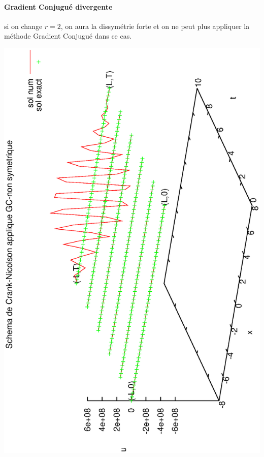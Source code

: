\documentclass{book}
\begin{document}
\paragraph{Gradient Conjugué divergente}
si on change $r=2$, on aura la dissymétrie forte et on ne peut plus appliquer la méthode Gradient Conjugué dans ce cas.
\begin{center}
\includegraphics[angle=-90, scale=0.40]{Crank-NicolsonGCdiv}%
\end{center}
\end{document}
